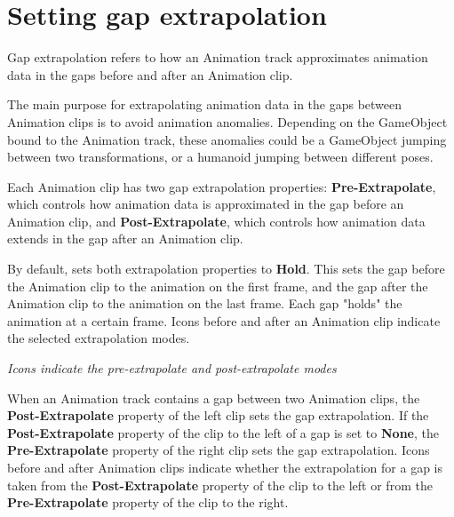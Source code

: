 \chapter{Setting gap extrapolation}
\hypertarget{md__library_2_package_cache_2com_8unity_8timeline_0d1_87_86_2_documentation_0i_2clp__gap__extrap}{}\label{md__library_2_package_cache_2com_8unity_8timeline_0d1_87_86_2_documentation_0i_2clp__gap__extrap}
\label{md__library_2_package_cache_2com_8unity_8timeline_0d1_87_86_2_documentation_0i_2clp__gap__extrap_autotoc_md1114}%
%
 Gap extrapolation refers to how an Animation track approximates animation data in the gaps before and after an Animation clip.

The main purpose for extrapolating animation data in the gaps between Animation clips is to avoid animation anomalies. Depending on the Game\+Object bound to the Animation track, these anomalies could be a Game\+Object jumping between two transformations, or a humanoid jumping between different poses.

Each Animation clip has two gap extrapolation properties\+: {\bfseries{Pre-\/\+Extrapolate}}, which controls how animation data is approximated in the gap before an Animation clip, and {\bfseries{Post-\/\+Extrapolate}}, which controls how animation data extends in the gap after an Animation clip.

By default,  sets both extrapolation properties to {\bfseries{Hold}}. This sets the gap before the Animation clip to the animation on the first frame, and the gap after the Animation clip to the animation on the last frame. Each gap "{}holds"{} the animation at a certain frame. Icons before and after an Animation clip indicate the selected extrapolation modes.



{\itshape Icons indicate the pre-\/extrapolate and post-\/extrapolate modes}

When an Animation track contains a gap between two Animation clips, the {\bfseries{Post-\/\+Extrapolate}} property of the left clip sets the gap extrapolation. If the {\bfseries{Post-\/\+Extrapolate}} property of the clip to the left of a gap is set to {\bfseries{None}}, the {\bfseries{Pre-\/\+Extrapolate}} property of the right clip sets the gap extrapolation. Icons before and after Animation clips indicate whether the extrapolation for a gap is taken from the {\bfseries{Post-\/\+Extrapolate}} property of the clip to the left or from the {\bfseries{Pre-\/\+Extrapolate}} property of the clip to the right.




